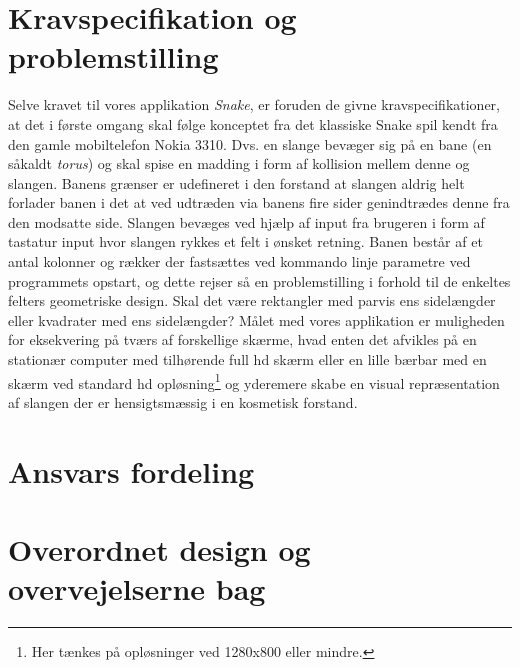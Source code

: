 \documentclass[]{article}
\begin{document}
\section{Kravspecifikation og problemstilling}

Selve kravet til  vores applikation \textit{Snake}, er foruden de givne kravspecifikationer, at det i første omgang skal følge konceptet fra det klassiske Snake spil kendt fra den gamle mobiltelefon Nokia 3310. Dvs. en slange bevæger sig på en bane (en såkaldt \textit{torus}) og skal spise en madding i form af kollision mellem denne og slangen. Banens grænser er udefineret i den forstand at slangen aldrig helt forlader banen i det at ved udtræden via banens fire sider genindtrædes denne fra den modsatte side. Slangen bevæges ved hjælp af input fra brugeren i form af tastatur input hvor slangen rykkes et felt i ønsket retning. Banen består af et antal kolonner og rækker der fastsættes ved kommando linje parametre ved programmets opstart, og dette rejser så en problemstilling i forhold til de enkeltes felters geometriske design. Skal det være rektangler med parvis ens sidelængder eller kvadrater med ens sidelængder? Målet med vores applikation er muligheden for eksekvering på tværs af forskellige skærme, hvad enten det afvikles på en stationær computer med tilhørende full hd skærm eller en lille bærbar med en skærm ved standard hd opløsning\footnote{Her tænkes på opløsninger ved 1280x800 eller mindre.} og yderemere skabe en visual repræsentation af slangen der er hensigtsmæssig i en kosmetisk forstand. 

\section{Ansvars fordeling}

\section{Overordnet design og overvejelserne bag}
\end{document}
